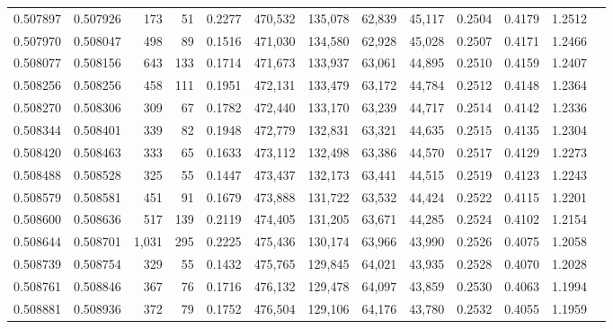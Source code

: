 \begin{tabular}{rrrrrrrrrrrrr}
0.507897 & 0.507926 &   173 &    51 &                                     0.2277 & 470,532 & 135,078 &  62,839 &  45,117 & 0.2504 & 0.4179 & 1.2512 \\
0.507970 & 0.508047 &   498 &    89 &                                     0.1516 & 471,030 & 134,580 &  62,928 &  45,028 & 0.2507 & 0.4171 & 1.2466 \\
0.508077 & 0.508156 &   643 &   133 &                                     0.1714 & 471,673 & 133,937 &  63,061 &  44,895 & 0.2510 & 0.4159 & 1.2407 \\
0.508256 & 0.508256 &   458 &   111 &                                     0.1951 & 472,131 & 133,479 &  63,172 &  44,784 & 0.2512 & 0.4148 & 1.2364 \\
0.508270 & 0.508306 &   309 &    67 &                                     0.1782 & 472,440 & 133,170 &  63,239 &  44,717 & 0.2514 & 0.4142 & 1.2336 \\
0.508344 & 0.508401 &   339 &    82 &                                     0.1948 & 472,779 & 132,831 &  63,321 &  44,635 & 0.2515 & 0.4135 & 1.2304 \\
0.508420 & 0.508463 &   333 &    65 &                                     0.1633 & 473,112 & 132,498 &  63,386 &  44,570 & 0.2517 & 0.4129 & 1.2273 \\
0.508488 & 0.508528 &   325 &    55 &                                     0.1447 & 473,437 & 132,173 &  63,441 &  44,515 & 0.2519 & 0.4123 & 1.2243 \\
0.508579 & 0.508581 &   451 &    91 &                                     0.1679 & 473,888 & 131,722 &  63,532 &  44,424 & 0.2522 & 0.4115 & 1.2201 \\
0.508600 & 0.508636 &   517 &   139 &                                     0.2119 & 474,405 & 131,205 &  63,671 &  44,285 & 0.2524 & 0.4102 & 1.2154 \\
0.508644 & 0.508701 & 1,031 &   295 &                                     0.2225 & 475,436 & 130,174 &  63,966 &  43,990 & 0.2526 & 0.4075 & 1.2058 \\
0.508739 & 0.508754 &   329 &    55 &                                     0.1432 & 475,765 & 129,845 &  64,021 &  43,935 & 0.2528 & 0.4070 & 1.2028 \\
0.508761 & 0.508846 &   367 &    76 &                                     0.1716 & 476,132 & 129,478 &  64,097 &  43,859 & 0.2530 & 0.4063 & 1.1994 \\
0.508881 & 0.508936 &   372 &    79 &                                     0.1752 & 476,504 & 129,106 &  64,176 &  43,780 & 0.2532 & 0.4055 & 1.1959 \\

\end{tabular}
